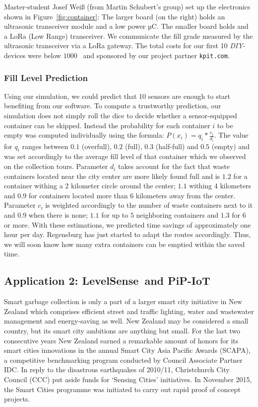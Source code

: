 \documentclass[10pt]{article}
\begin{document}
Master-student Josef Wei{\ss} (from Martin Schubert's group) set up the electronics
shown in Figure~\ref{fig:container}: The larger board (on the right) holds an ultrasonic transceiver module and a low power µC. The smaller board holds and a 
LoRa (Low Range) transceiver. We communicate the fill grade measured by the 
ultrasonic transceiver via a LoRa gateway. The total costs for our first 10 
{\it DIY}-devices 
were below $1000$~\EUR{} and sponsored by our project partner {\tt kpit.com}.

\subsubsection{Fill Level Prediction}
\label{sec:predict}

Using our simulation, we could predict that 10 sensors are enough to start
benefiting from our software. To compute a trustworthy prediction, our simulation
does not simply roll the dice to decide whether a sensor-equipped container can
be skipped. Instead the probability for each container $i$ to be empty was 
computed individually using the formula: $P(x_i)=q_i* \frac{c_i}{d_i}$. The value for 
$q_i$ ranges between $0.1$ (overfull), $0.2$ (full), $0.3$ (half-full) and $0.5$ (empty)
and was set accordingly to the average fill level of that container which we observed on
the collection tours. Parameter $d_i$ takes account for the fact that waste containers 
located near the city center are more likely found full and is $1.2$ for a container
withing a $2$ kilometer circle around the center; $1.1$ withing $4$ kilometers and $0.9$ for 
containers located more than $6$ kilometers away from the center. Parameter $c_i$ is weighted 
accordingly to the number of waste containers next to it and $0.9$ when there is none; 
$1.1$ for up to $5$ neighboring containers and $1.3$ for $6$ or more.
With these estimations, we predicted time savings of approximately one hour per day.
Regensburg has just started to adapt the routes accordingly. Thus, we will soon
know how many extra containers can be emptied within the saved time.

\subsection{Application 2: LevelSense\texttrademark ~and PiP-IoT}
\label{sec:Christchurch}

Smart garbage collection is only a part of a larger smart city initiative in
New Zealand which comprises efficient street and traffic lighting, 
water and wastewater management and energy-saving as well.
New Zealand may be considered a small country, but its smart city ambitions are 
anything but small. For the last two consecutive years New Zealand earned a remarkable amount of honors for its smart cities innovations in the annual Smart City Asia Pacific Awards (SCAPA), a competitive benchmarking program conducted by Council Associate Partner IDC.
In reply to the disastrous earthquakes of 2010/11, Christchurch City Council (CCC) put aside funds for ‘Sensing Cities’ initiatives. In November 2015, the Smart Cities programme was initiated to carry out rapid proof of concept projects.
\end{document}
